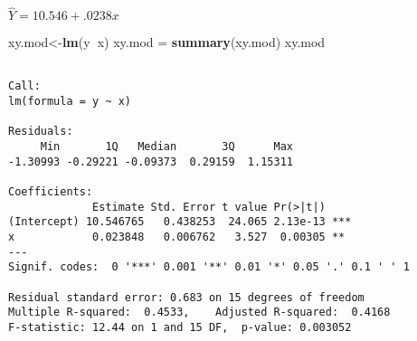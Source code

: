 \documentclass[]{article}
\newenvironment{Shaded}{\begin{snugshade}}{\end{snugshade}}
\newcommand{\KeywordTok}[1]{\textcolor[rgb]{0.13,0.29,0.53}{\textbf{#1}}}
\newcommand{\StringTok}[1]{\textcolor[rgb]{0.31,0.60,0.02}{#1}}
\newcommand{\OperatorTok}[1]{\textcolor[rgb]{0.81,0.36,0.00}{\textbf{#1}}}
\newcommand{\NormalTok}[1]{#1}
\begin{document}
{\(\hat{Y} = 10.546 + .0238x\)

\begin{Shaded}
\begin{Highlighting}[]
\NormalTok{xy.mod<-}\KeywordTok{lm}\NormalTok{(y}\OperatorTok{~}\NormalTok{x)}
\NormalTok{xy.mod =}\StringTok{ }\KeywordTok{summary}\NormalTok{(xy.mod)}
\NormalTok{xy.mod}
\end{Highlighting}
\end{Shaded}

\begin{verbatim}

Call:
lm(formula = y ~ x)

Residuals:
     Min       1Q   Median       3Q      Max 
-1.30993 -0.29221 -0.09373  0.29159  1.15311 

Coefficients:
             Estimate Std. Error t value Pr(>|t|)    
(Intercept) 10.546765   0.438253  24.065 2.13e-13 ***
x            0.023848   0.006762   3.527  0.00305 ** 
---
Signif. codes:  0 '***' 0.001 '**' 0.01 '*' 0.05 '.' 0.1 ' ' 1

Residual standard error: 0.683 on 15 degrees of freedom
Multiple R-squared:  0.4533,    Adjusted R-squared:  0.4168 
F-statistic: 12.44 on 1 and 15 DF,  p-value: 0.003052
\end{verbatim}
\end{document}
